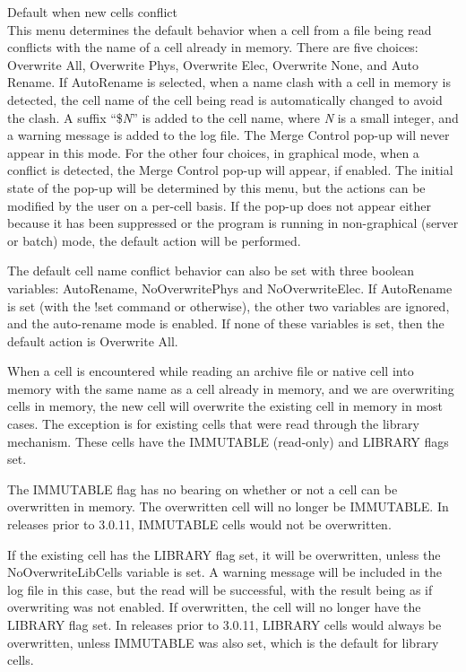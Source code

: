 \begin{description}
\item{\cb Default when new cells conflict}\\
This menu determines the default behavior when a cell from a file
being read conflicts with the name of a cell already in memory.  There
are five choices:  {\cb Overwrite All}, {\cb Overwrite Phys}, {\cb
Overwrite Elec}, {\cb Overwrite None}, and {\cb Auto Rename}.  If {\cb
AutoRename} is selected, when a name clash with a cell in memory is
detected, the cell name of the cell being read is automatically
changed to avoid the clash.  A suffix ``{\vt \$}{\it N}'' is added to
the cell name, where {\it N} is a small integer, and a warning message
is added to the log file.  The {\cb Merge Control} pop-up will never
appear in this mode.  For the other four choices, in graphical mode,
when a conflict is detected, the {\cb Merge Control} pop-up will
appear, if enabled.  The initial state of the pop-up will be
determined by this menu, but the actions can be modified by the user
on a per-cell basis.  If the pop-up does not appear either because it
has been suppressed or the program is running in non-graphical (server
or batch) mode, the default action will be performed.

The default cell name conflict behavior can also be set with three
boolean variables:  {\et AutoRename}, {\et NoOverwritePhys} and {\et
NoOverwriteElec}.  If {\et AutoRename} is set (with the {\cb !set}
command or otherwise), the other two variables are ignored, and the
auto-rename mode is enabled.  If none of these variables is set, then
the default action is {\cb Overwrite All}.

When a cell is encountered while reading an archive file or native
cell into memory with the same name as a cell already in memory, and
we are overwriting cells in memory, the new cell will overwrite the
existing cell in memory in most cases.  The exception is for existing
cells that were read through the library mechanism.  These cells have
the IMMUTABLE (read-only) and LIBRARY flags set.
 
The IMMUTABLE flag has no bearing on whether or not a cell can be
overwritten in memory.  The overwritten cell will no longer be
IMMUTABLE.  In releases prior to 3.0.11, IMMUTABLE cells would not be
overwritten.

If the existing cell has the LIBRARY flag set, it will be overwritten,
unless the {\et NoOverwriteLibCells} variable is set.  A warning
message will be included in the log file in this case, but the read
will be successful, with the result being as if overwriting was not
enabled.  If overwritten, the cell will no longer have the LIBRARY
flag set.  In releases prior to 3.0.11, LIBRARY cells would always be
overwritten, unless IMMUTABLE was also set, which is the default for
library cells.


\end{description}
